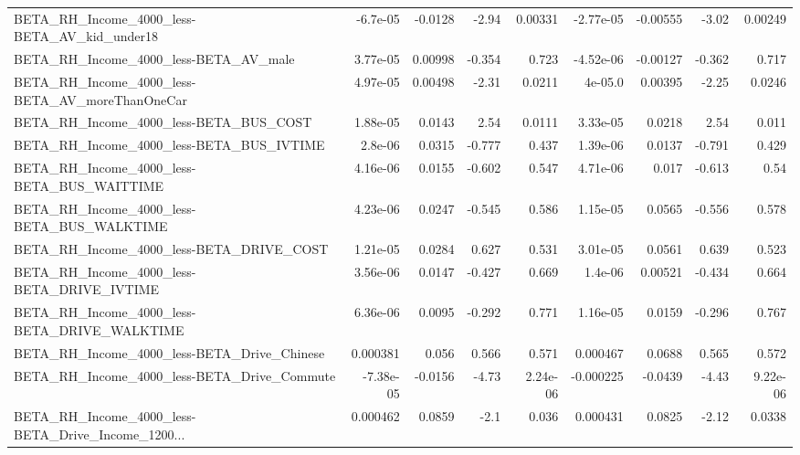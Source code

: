 \begin{tabular}{lrrrrrrrr}
BETA\_RH\_Income\_4000\_less-BETA\_AV\_kid\_under18       &    -6.7e-05 &      -0.0128 &     -2.94 &  0.00331 &  -2.77e-05 &    -0.00555 &        -3.02 &       0.00249 \\
BETA\_RH\_Income\_4000\_less-BETA\_AV\_male              &    3.77e-05 &      0.00998 &    -0.354 &    0.723 &  -4.52e-06 &    -0.00127 &       -0.362 &         0.717 \\
BETA\_RH\_Income\_4000\_less-BETA\_AV\_moreThanOneCar    &    4.97e-05 &      0.00498 &     -2.31 &   0.0211 &    4e-05.0 &     0.00395 &        -2.25 &        0.0246 \\
BETA\_RH\_Income\_4000\_less-BETA\_BUS\_COST             &    1.88e-05 &       0.0143 &      2.54 &   0.0111 &   3.33e-05 &      0.0218 &         2.54 &         0.011 \\
BETA\_RH\_Income\_4000\_less-BETA\_BUS\_IVTIME           &     2.8e-06 &       0.0315 &    -0.777 &    0.437 &   1.39e-06 &      0.0137 &       -0.791 &         0.429 \\
BETA\_RH\_Income\_4000\_less-BETA\_BUS\_WAITTIME         &    4.16e-06 &       0.0155 &    -0.602 &    0.547 &   4.71e-06 &       0.017 &       -0.613 &          0.54 \\
BETA\_RH\_Income\_4000\_less-BETA\_BUS\_WALKTIME         &    4.23e-06 &       0.0247 &    -0.545 &    0.586 &   1.15e-05 &      0.0565 &       -0.556 &         0.578 \\
BETA\_RH\_Income\_4000\_less-BETA\_DRIVE\_COST           &    1.21e-05 &       0.0284 &     0.627 &    0.531 &   3.01e-05 &      0.0561 &        0.639 &         0.523 \\
BETA\_RH\_Income\_4000\_less-BETA\_DRIVE\_IVTIME         &    3.56e-06 &       0.0147 &    -0.427 &    0.669 &    1.4e-06 &     0.00521 &       -0.434 &         0.664 \\
BETA\_RH\_Income\_4000\_less-BETA\_DRIVE\_WALKTIME       &    6.36e-06 &       0.0095 &    -0.292 &    0.771 &   1.16e-05 &      0.0159 &       -0.296 &         0.767 \\
BETA\_RH\_Income\_4000\_less-BETA\_Drive\_Chinese        &    0.000381 &        0.056 &     0.566 &    0.571 &   0.000467 &      0.0688 &        0.565 &         0.572 \\
BETA\_RH\_Income\_4000\_less-BETA\_Drive\_Commute        &   -7.38e-05 &      -0.0156 &     -4.73 & 2.24e-06 &  -0.000225 &     -0.0439 &        -4.43 &      9.22e-06 \\
BETA\_RH\_Income\_4000\_less-BETA\_Drive\_Income\_1200... &    0.000462 &       0.0859 &      -2.1 &    0.036 &   0.000431 &      0.0825 &        -2.12 &        0.0338 \\

\end{tabular}
